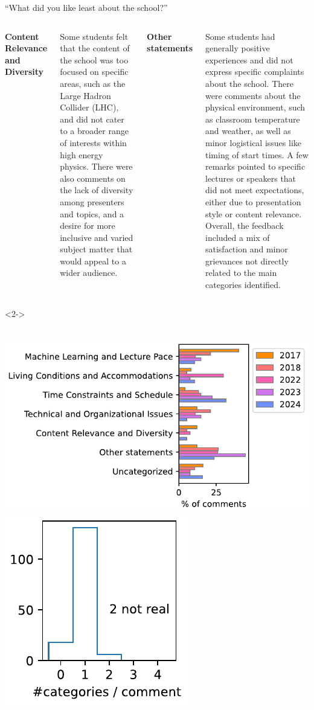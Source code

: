 \documentclass[aspectratio=169]{beamer}
\begin{document}
\begin{frame}{``What did you like least about the school?''}
\begin{columns}
\vspace{0.2 cm}
{\bf\small Content Relevance and Diversity}

Some students felt that the content of the school was too focused on specific areas, such as the Large Hadron Collider (LHC), and did not cater to a broader range of interests within high energy physics. There were also comments on the lack of diversity among presenters and topics, and a desire for more inclusive and varied subject matter that would appeal to a wider audience.

\vspace{0.2 cm}
{\bf\small Other statements}

Some students had generally positive experiences and did not express specific complaints about the school. There were comments about the physical environment, such as classroom temperature and weather, as well as minor logistical issues like timing of start times. A few remarks pointed to specific lectures or speakers that did not meet expectations, either due to presentation style or content relevance. Overall, the feedback included a mix of satisfaction and minor grievances not directly related to the main categories identified.

\end{columns}

\begin{uncoverenv}<2->
\vspace{-5 cm}
\begin{tcolorbox}[colback=white, colframe=black]
\begin{minipage}{\linewidth}
\mbox{ } \hfill \includegraphics[height=4 cm]{PLOTS/like_least_categorization.pdf}\includegraphics[height=3 cm]{PLOTS/like_least_categorization_hist.pdf} \hfill \mbox{ }
\end{minipage}
\end{tcolorbox}
\end{uncoverenv}
\end{frame}
\end{document}
